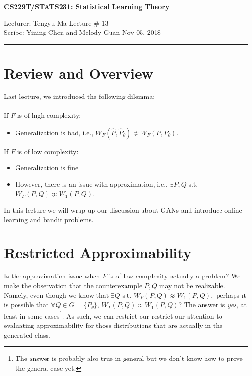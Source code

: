 \documentclass[11pt]{article}
\newcommand{\draftnotice}{\vbox to 0.25in{\noindent
   \raisebox{0.6in}[0in][0in]{\makebox[\textwidth][r]{\it
    DRAFT --- a final version will be posted shortly}}}
   \vspace{-.25in}\vspace{-\baselineskip}
}
\begin{document}
\thispagestyle{empty}


\begin{center}
\bf\large CS229T/STATS231: Statistical Learning Theory
\end{center}

\noindent
Lecturer: Tengyu Ma   %
\hfill
Lecture \# 13         %
\\
Scribe: Yining Chen and Melody Guan                 %
\hfill
Nov 05, 2018           %

\noindent
\rule{\textwidth}{1pt}

\medskip


\section{Review and Overview}

Last lecture, we introduced the following dilemma:\\\\
If $F$ is of high complexity:
\begin{itemize}
    \item Generalization is bad, i.e., $W_F(\hat{P},\hat{P}_{\theta})\not\approx W_F(P,P_\theta)$.
\end{itemize}
If $F$ is of low complexity: 
\begin{itemize}
\item Generalization is fine. 
\item However, there is an issue with approximation, i.e., $\exists P,Q$ s.t. $W_F(P,Q) \not\approx W_1(P,Q)$.
\end{itemize}

In this lecture we will wrap up our discussion about GANs and introduce online learning and bandit problems. 

\section{Restricted Approximability}
Is the approximation issue when $F$ is of low complexity actually a problem? We make the observation that the counterexample $P,Q$ may not be realizable. Namely, even though we know that $\exists Q$ s.t. $W_F(P,Q)\not\approx W_1(P,Q),$ perhaps it is possible that $\forall Q\in G = \{P_\theta\}$, $W_F(P,Q) \approx W_1(P,Q)$? The answer is \textit{yes}, at least in some cases\footnote{The answer is probably also true in general but we don't know how to prove the general case yet.}. As such, we can restrict our 
restrict our attention to evaluating approximability for those distributions that are actually in the generated class.
\end{document}
